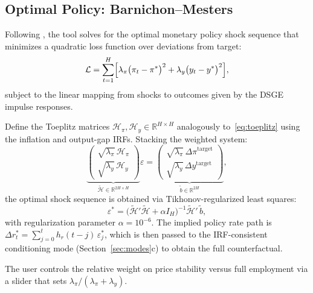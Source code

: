 \documentclass[11pt]{article}
\newcommand{\R}{\mathbb{R}}
\theoremstyle{definition}
\theoremstyle{remark}
\begin{document}
\subsection{Optimal Policy: Barnichon--Mesters}\label{sec:bm}

Following \citet{BarnichonMesters2023}, the tool solves for the
optimal monetary policy shock sequence that minimizes a quadratic loss
function over deviations from target:
\begin{equation}\label{eq:loss}
  \mathcal{L} = \sum_{t=1}^{H} \Bigl[
    \lambda_\pi \bigl(\pi_t - \pi^*\bigr)^2
    + \lambda_y \bigl(y_t - y^*\bigr)^2
  \Bigr],
\end{equation}
subject to the linear mapping from shocks to outcomes given by the
DSGE impulse responses.

Define the Toeplitz matrices
$\mathcal{H}_\pi, \mathcal{H}_y \in \R^{H \times H}$ analogously
to~\eqref{eq:toeplitz} using the inflation and output-gap IRFs.
Stacking the weighted system:
\begin{equation}\label{eq:bm_stack}
  \underbrace{\begin{pmatrix}
    \sqrt{\lambda_\pi}\, \mathcal{H}_\pi \\[3pt]
    \sqrt{\lambda_y}\, \mathcal{H}_y
  \end{pmatrix}}_{\tilde{\mathcal{H}} \in \R^{2H \times H}}
  \varepsilon
  = \underbrace{\begin{pmatrix}
    \sqrt{\lambda_\pi}\, \Delta\pi^{\text{target}} \\[3pt]
    \sqrt{\lambda_y}\, \Delta y^{\text{target}}
  \end{pmatrix}}_{\tilde{b} \in \R^{2H}},
\end{equation}
the optimal shock sequence is obtained via Tikhonov-regularized
least squares:
\begin{equation}\label{eq:bm_solve}
  \varepsilon^* = \bigl(\tilde{\mathcal{H}}'\tilde{\mathcal{H}}
  + \alpha I_H\bigr)^{-1} \tilde{\mathcal{H}}'\, \tilde{b},
\end{equation}
with regularization parameter $\alpha = 10^{-6}$.  The implied policy
rate path is
$\Delta r_t^* = \sum_{j=0}^{t} h_r(t{-}j)\,\varepsilon_j^*$, which
is then passed to the IRF-consistent conditioning mode
(Section~\ref{sec:modes}c) to obtain the full counterfactual.

The user controls the relative weight on price stability versus full
employment via a slider that sets
$\lambda_\pi / (\lambda_\pi + \lambda_y)$.


\end{document}
